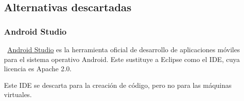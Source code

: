 \subsection{Alternativas descartadas}

\subsubsection{Android Studio}
~\href{https://developer.android.com/studio}{Android Studio} es la herramienta oficial de desarrollo de aplicaciones móviles para el sistema operativo Android. Este sustituye a Eclipse como el IDE, cuya licencia es Apache 2.0.

Este IDE se descarta para la creación de código, pero no para las máquinas virtuales.
